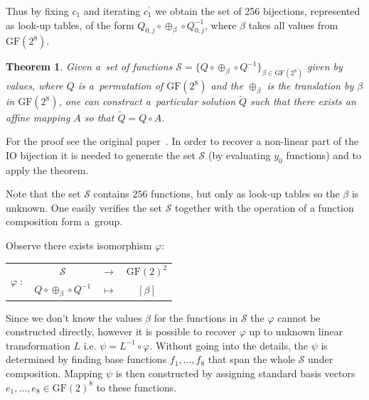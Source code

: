 \documentclass[11pt,oneside,final]{fithesis2}
\newtheorem{mytheorem}{Theorem}
\newcommand{\gfe}{\ensuremath{\text{GF}\left(2^8\right)}}
\newcommand{\gf}{\ensuremath{\text{GF}\left(2\right)}}
\begin{document}
    Thus by fixing $c_1$ and iterating $c^{\prime}_1$ we obtain the set of 256 bijections, represented as look-up tables, 
    of the form $Q_{0,j} \circ \oplus_{\beta} \circ Q^{-1}_{0,j}$, where $\beta$ takes all values from $\gfe$.
    
    \begin{mytheorem}\label{prop:bge1}
     Given a~set of functions $\mathcal{S} = \{Q \circ \oplus_{\beta} \circ Q^{-1}\}_{\beta \in \gfe}$ given by values, 
     where $Q$ is a~permutation of $\gfe$ and the $\oplus_{\beta}$ is the translation by $\beta$ in $\gfe$, one can construct a~particular
     solution $\widetilde{Q}$ such that there exists an affine mapping $A$ so that $\widetilde{Q} = Q \circ A$.
    \end{mytheorem}
    
    For the proof see the original paper~\citep{Billet:2004:CWB:2080787.2080809}. In order to recover a non-linear part of the IO bijection it is needed to generate
    the set $\mathcal{S}$ (by evaluating $y_0$ functions) and to apply the theorem.
    
    Note that the set $\mathcal{S}$ contains $256$ functions, but only as look-up tables so the $\beta$ is unknown. One easily verifies the set
    $\mathcal{S}$ together with the operation of a function composition form a~group. 
    
    Observe there exists isomorphism $\varphi:\; $
    
    \begin{center}
    \begin{tabular}{ r  c c c }
	\multirow{2}{*}{$\varphi \; :$} & $\mathcal{S}$  & $\longrightarrow$ & $\gf^2$ \\
	                                & $Q \circ \oplus_{\beta} \circ Q^{-1} $ & $\longmapsto$ & $\left[ \beta \right]$
	
    \end{tabular}
    \end{center}
    
    Since we don't know the values $\beta$ for the functions in $\mathcal{S}$ the $\varphi$ cannot be constructed directly, however it is possible to 
    recover $\varphi$ up to unknown linear transformation $L$ i.e. $\psi = L^{-1} \circ \varphi$. Without going into the details, the 
    $\psi$ is determined by finding base functions $f_1,\dots,f_8$ that span the whole $\mathcal{S}$ under composition. Mapping $\psi$ is then constructed by assigning
    standard basis vectors $e_1,\dots,e_8 \in \gf^8$ to these functions.
    
\end{document}
